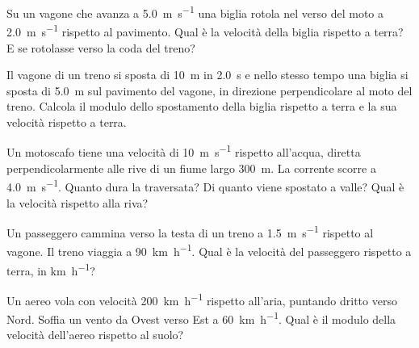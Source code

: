 \begin{esercizio}
Su un vagone che avanza a \SI{5,0}{\metre\per\second} una biglia rotola nel verso del moto a \SI{2,0}{\metre\per\second} rispetto al pavimento. Qual è la velocità della biglia rispetto a terra? E se rotolasse verso la coda del treno?\\
\end{esercizio}

\begin{esercizio}
Il vagone di un treno si sposta di \SI{10}{\metre} in \SI{2,0}{\second} e nello stesso tempo una biglia si sposta di \SI{5,0}{\metre} sul pavimento del vagone, in direzione perpendicolare al moto del treno. Calcola il modulo dello spostamento della biglia rispetto a terra e la sua velocità rispetto a terra.\\
\end{esercizio}

\begin{esercizio}
Un motoscafo tiene una velocità di \SI{10}{\metre\per\second} rispetto all'acqua, diretta perpendicolarmente alle rive di un fiume largo \SI{300}{\metre}. La corrente scorre a \SI{4,0}{\metre\per\second}. Quanto dura la traversata? Di quanto viene spostato a valle? Qual è la velocità rispetto alla riva?\\
\end{esercizio}

\begin{esercizio}
Un passeggero cammina verso la testa di un treno a \SI{1,5}{\metre\per\second} rispetto al vagone. Il treno viaggia a \SI{90}{\kilo\metre\per\hour}. Qual è la velocità del passeggero rispetto a terra, in \si{\kilo\metre\per\hour}?\\
\end{esercizio}

\begin{esercizio}
Un aereo vola con velocità \SI{200}{\kilo\metre\per\hour} rispetto all'aria, puntando dritto verso Nord. Soffia un vento da Ovest verso Est a \SI{60}{\kilo\metre\per\hour}. Qual è il modulo della velocità dell'aereo rispetto al suolo?\\
\end{esercizio}

